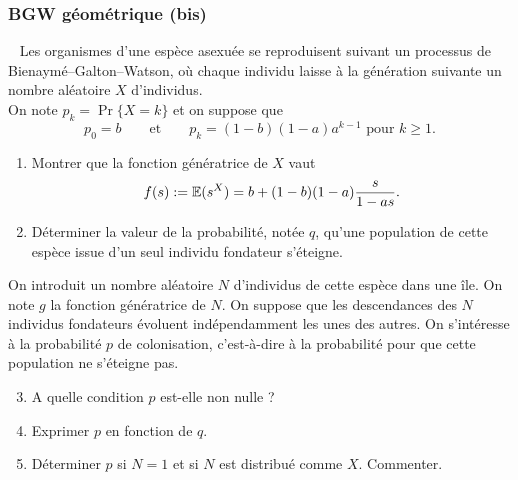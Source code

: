 \subsubsection{BGW géométrique (bis)}

\begin{exercise}[Probabilités] ~ \label{exam:Proba}
  Les organismes d’une espèce asexuée se reproduisent suivant un processus de Bienaymé–Galton–Watson, où chaque individu laisse à la génération suivante un nombre aléatoire $X$ d’individus. \\
  On note $p_k = \Pr\{X = k\}$ et on suppose que 
  $$
  p_0 = b
  \qquad \text{et} \qquad 
  p_k = (1 - b) (1 - a) a^{k-1} \text{ pour } k \geq 1.
  $$
  \begin{enumerate}
    \item Montrer que la fonction génératrice de $X$ vaut
    $$
    f(s) := \operatorname{\mathbb{E}}(s^X) = b + (1-b)(1-a) \frac{s}{1 - as}.
    $$
    \item Déterminer la valeur de la probabilité, notée $q$, qu'une population de cette espèce issue d’un seul individu fondateur s'éteigne.
    \solution{\todo{}}
  \end{enumerate}
  On introduit un nombre aléatoire $N$ d'individus de cette espèce dans une île. On note $g$ la fonction génératrice de $N$. On suppose que les descendances des $N$ individus fondateurs évoluent indépendamment les unes des autres. On s'intéresse à la probabilité $p$ de colonisation, c'est-à-dire à la probabilité pour que cette population ne s'éteigne pas.
  \begin{enumerate}
    \setcounter{enumi}{2}
    \item A quelle condition $p$ est-elle non nulle ?
    \solution{\todo{}}
    \item Exprimer $p$ en fonction de $q$. 
    \solution{\todo{}}
    \item Déterminer $p$ si $N = 1$ et si $N$ est distribué comme $X$. Commenter.
    \solution{\todo{}}
  \end{enumerate}
\end{exercise}

